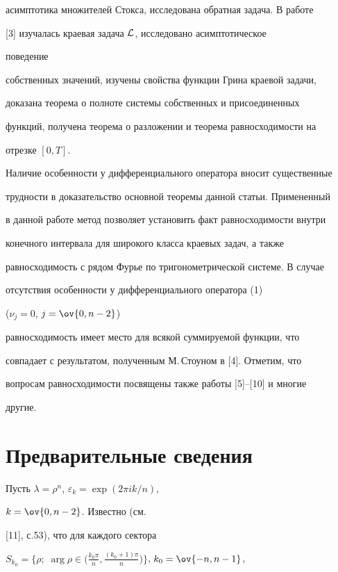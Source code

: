 асимптотика множителей Стокса, исследована обратная задача. В работе


[3] изучалась краевая задача $\cal L$, исследовано асимптотическое


поведение


собственных значений, изучены свойства функции Грина краевой задачи,


доказана теорема о полноте системы собственных и присоединенных


функций, получена теорема о разложении и теорема равносходимости на


отрезке $[0,T]$.





Наличие особенности у дифференциального оператора вносит существенные


трудности в доказательство основной теоремы данной статьи. Примененный


в данной работе метод позволяет установить факт равносходимости внутри


конечного интервала для широкого класса краевых задач, а также


равносходимость с рядом Фурье по тригонометрической системе. В случае


отсутствия особенности у дифференциального оператора (1)


($\nu_j=0$, $j=\ov{0,n-2}$)


равносходимость имеет место для всякой суммируемой функции, что


совпадает с результатом, полученным М.\,Стоуном в [4]. Отметим, что


вопросам равносходимости посвящены также работы [5]--[10] и многие


другие.





\section{Предварительные сведения}





Пусть $\lambda=\rho^n$, $\varepsilon_k=\exp(2\pi ik/n)$,


$k=\ov{0,n-2}$. Известно (см.


[11], с.53), что для каждого сектора


$S_{k_0}=\bigl\{\rho;\;\arg\rho\in\bigl(\frac{k_0\pi}{n},


\frac{(k_0+1)\pi}{n}\bigr)\bigr\}$, $k_0=\ov{-n,n-1}$,


